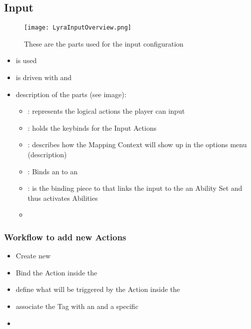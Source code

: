         \subsection{Input}
            \begin{figure}
                \texttt{[image: LyraInputOverview.png]}
                \caption{These are the parts used for the input configuration}
            \end{figure}
            \begin{itemize}
                \item {} is used
                \item is driven with  and 
                \item description of the parts (see image):
                \begin{itemize}
                    \item {} : represents the logical actions the player can input
                    \item {} : holds the keybinds for the Input Actions
                    \item {} : describes how the Mapping Context will show up in the options menu (description)
                    \item {} : Binds an  to an 
                    \item {} : is the binding piece to that links the input to the an Ability Set and thus activates Abilities
                    \item \code{}
                \end{itemize}
            \end{itemize}
            
            \subsubsection{Workflow to add new Actions}
                \begin{itemize}
                    \item Create new 
                    \item Bind the Action inside the 
                    \item define what  will be triggered by the Action inside the 
                    \item associate the Tag with an  and a specific 
                    \item 
                \end{itemize}



